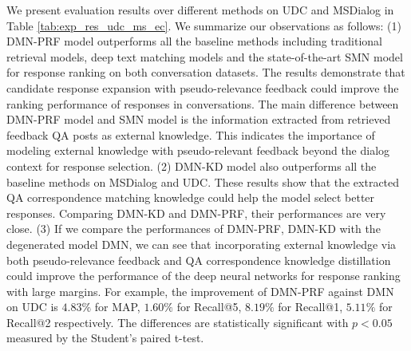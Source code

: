 We present evaluation results over different methods on UDC and MSDialog in Table \ref{tab:exp_res_udc_ms_ec}. We summarize our observations as follows: (1) DMN-PRF model outperforms all the baseline methods including traditional retrieval models, deep text matching models and the state-of-the-art SMN model for response ranking on both conversation datasets. The results demonstrate that candidate response expansion with pseudo-relevance feedback could improve the ranking performance of responses in conversations. The main difference between DMN-PRF model and SMN model is the information extracted from retrieved feedback QA posts as external knowledge. This indicates the importance of modeling external knowledge with pseudo-relevant feedback beyond the dialog context for response selection. (2) DMN-KD model also outperforms all the baseline methods on MSDialog and UDC. These results show that the extracted QA correspondence matching knowledge could help the model select better responses. Comparing DMN-KD and DMN-PRF, their performances are very close. (3) If we compare the performances of DMN-PRF, DMN-KD with the degenerated model DMN, we can see that incorporating external knowledge via both pseudo-relevance feedback and QA correspondence knowledge distillation could improve the performance of the deep neural networks for response ranking with large margins. For example, the improvement of DMN-PRF against DMN on UDC is $4.83\%$ for MAP, $1.60\%$ for Recall@5, $8.19\%$ for Recall@1, $5.11\%$ for Recall@2 respectively. The differences are statistically significant with $p < 0.05$ measured by the Student's paired t-test. %

